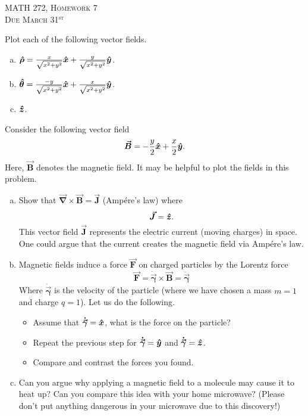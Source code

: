 \documentclass[12pt]{article} %
\newcommand{\grad}{\boldsymbol{\vec{\nabla}}}
\newcommand{\tangentgamma}{\boldsymbol{\dot{\vec{\gamma}}}}
\newcommand{\normalgamma}{\boldsymbol{\ddot{\vec{\gamma}}}}
\newcommand{\thetahat}{\boldsymbol{\hat{\theta}}}
\newcommand{\rhohat}{\boldsymbol{\hat{\rho}}}
\newcommand{\vecfieldB}{\boldsymbol{\vec{B}}}
\newcommand{\vecfieldJ}{\boldsymbol{\vec{J}}}
\newcommand{\vecfieldF}{\boldsymbol{\vec{F}}}
\begin{document}
\begin{center}
   \textsc{\large MATH 272, Homework 7}\\
   \textsc{Due March 31$^\textrm{st}$}
\end{center}
\vspace{.5cm}

\begin{problem}
    Plot each of the following vector fields.
    \begin{enumerate}[(a)]
        \item $\rhohat = \frac{x}{\sqrt{x^2+y^2}}\xhat + \frac{y}{\sqrt{x^2+y^2}}\yhat$.
        \item $\thetahat = \frac{-y}{\sqrt{x^2+y^2}}\xhat + \frac{x}{\sqrt{x^2+y^2}}\yhat$.
        \item $\boldsymbol{\hat{z}}$.
    \end{enumerate}
\end{problem}

\begin{problem}
Consider the following vector field
\[
\vecfieldB = -\frac{y}{2}\xhat + \frac{x}{2}\yhat.
\]
Here, $\vecfieldB$ denotes the magnetic field. It may be helpful to plot the fields in this problem.
\begin{enumerate}[(a)]
    \item Show that $\grad \times \vecfieldB = \vecfieldJ$ (Amp\'ere's law) where 
    \[
    \vecfieldJ = \zhat.
    \]
    This vector field $\vecfieldJ$ represents the electric current (moving charges) in space. One could argue that the current creates the magnetic field via Amp\'ere's law.
    \item Magnetic fields induce a force $\vecfieldF$ on charged particles by the Lorentz force
    \[
    \vecfieldF = \tangentgamma \times \vecfieldB = \normalgamma
    \]
    Where $\tangentgamma$ is the velocity of the particle (where we have chosen a mass $m=1$ and charge $q=1$).  Let us do the following.
    \begin{itemize}
        \item Assume that $\tangentgamma = \xhat$, what is the force on the particle?
        \item Repeat the previous step for $\tangentgamma=\yhat$ and $\tangentgamma=\zhat$. 
        \item Compare and contrast the forces you found.
    \end{itemize}
    \item Can you argue why applying a magnetic field to a molecule may cause it to heat up? Can you compare this idea with your home microwave? (Please don't put anything dangerous in your microwave due to this discovery!)
\end{enumerate}
\end{problem}
\end{document}
